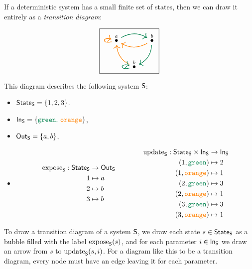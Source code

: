 \documentclass[DynamicalBook]{subfiles}
\begin{document}
\begin{example}\label{ex.transition_diagram_discrete}
  If a deterministic system has a small finite set of states, then we can draw it
entirely as a \emph{transition diagram}:

\[
\begin{tikzpicture}
	\node[draw] {
  \begin{tikzcd}[column sep=small]
  	\LMO{a}\ar[rr, dgreen, thick, bend left]\ar[loop left, thick, orange]&&
  	\LMO{b}\ar[ll, thick, orange, bend left]\ar[dl, bend left, thick, dgreen]\\&
  	\LMO{b} \ar[ul, thick, orange, bend left] \ar[loop left, thick, dgreen]
  \end{tikzcd}
  };
\end{tikzpicture}
\]

This diagram describes the following system $\mathsf{S}$:
\begin{itemize}
\item $\mathsf{State}_{\mathsf{S}} = \{1, 2, 3\}$.
\item $\In{S} = \{{\color{dgreen} \const{green},\, {\color{orange} \const{orange}}}\}$,
\item $\mathsf{Out}_{\mathsf{S}} = \{a, b\}$,
\item \[\begin{aligned}
        \expose{S} : \State{S} &\to \Out{S} \\
        1 &\mapsto a \\
        2 &\mapsto b \\
        3 &\mapsto b
      \end{aligned} \quad\quad\quad\quad
 \begin{aligned}
        \update{S} : \State{S} \times \In{S} &\to \In{S} \\
        (1, {\color{dgreen} \const{green}}) &\mapsto 2 \\
        (1, {\color{orange} \const{orange}}) &\mapsto 1 \\
        (2, {\color{dgreen} \const{green}}) &\mapsto 3 \\
        (2, {\color{orange} \const{orange}}) &\mapsto 1 \\
        (3, {\color{dgreen} \const{green}}) &\mapsto 3 \\
        (3, {\color{orange} \const{orange}}) &\mapsto 1 \\
      \end{aligned}
      \]
\end{itemize}

To draw a transition diagram of a system $\mathsf{S}$, we draw each state $s \in
\mathsf{State}_{\mathsf{S}}$ as a bubble filled with the label $\mathrm{expose}_{\mathsf{S}}(s)$, and for each
parameter $i \in \mathsf{In}_{\mathsf{S}}$ we draw an arrow from $s$ to $\mathrm{update}_{\mathsf{S}}(s, i)$. For a
diagram like this to be a transition diagram, every node must have an edge
leaving it for each parameter.
\end{example}
\end{document}
